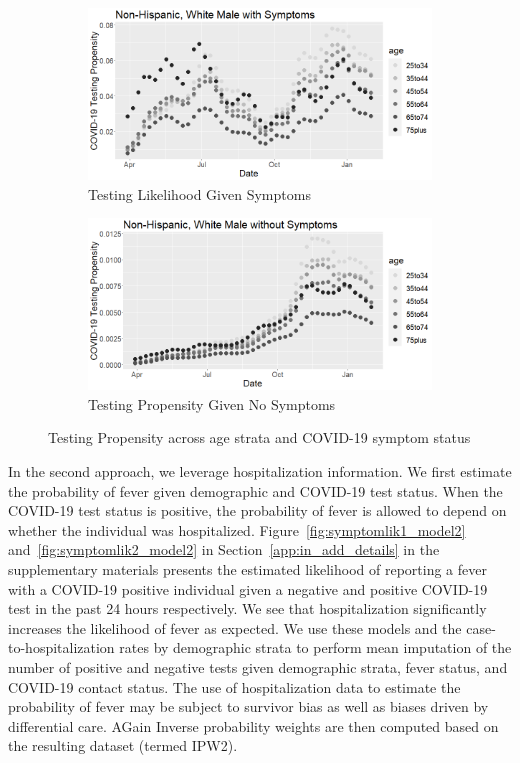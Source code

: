 \documentclass[11pt]{amsart}
\numberwithin{equation}{section}
\theoremstyle{plain}
\begin{document}
 \begin{figure}[!th]
 \centering
 \begin{subfigure}{.5\textwidth}
  \centering
  \includegraphics[width=.9\linewidth]{../figs/tvprop_alt_fig1_mainpaper.png}
  \caption{Testing Likelihood Given Symptoms}
  \label{fig:testinglik1_mainpaper}
 \end{subfigure}%
 \begin{subfigure}{.5\textwidth}
  \centering
 \includegraphics[width=.9\linewidth]{../figs/tvprop_alt_fig2_mainpaper.png}
  \caption{Testing Propensity Given No Symptoms}
  \label{fig:testinglik2_mainpaper}
 \end{subfigure}
 \caption{Testing Propensity across age strata and COVID-19 symptom status}
 \label{fig:testinglik_mainpaper}
 \end{figure}


 In the second approach, we leverage hospitalization information. We first estimate the probability of fever given demographic and COVID-19 test status.  When the COVID-19 test status is positive, the probability of fever is allowed to depend on whether the individual was hospitalized.  Figure~\ref{fig:symptomlik1_model2} and~\ref{fig:symptomlik2_model2} in Section~\ref{app:in_add_details} in the supplementary materials presents the estimated likelihood of reporting a fever with a COVID-19 positive individual given a negative and positive COVID-19 test in the past 24 hours respectively.  We see that hospitalization significantly increases the likelihood of fever as expected.  We use these models and the case-to-hospitalization rates by demographic strata to perform mean imputation of the number of positive and negative tests given demographic strata, fever status, and COVID-19 contact status. The use of hospitalization data to estimate the probability of fever may be subject to survivor bias as well as biases driven by differential care.  AGain   Inverse probability weights are then computed based on the resulting dataset (termed IPW2).
\end{document}
